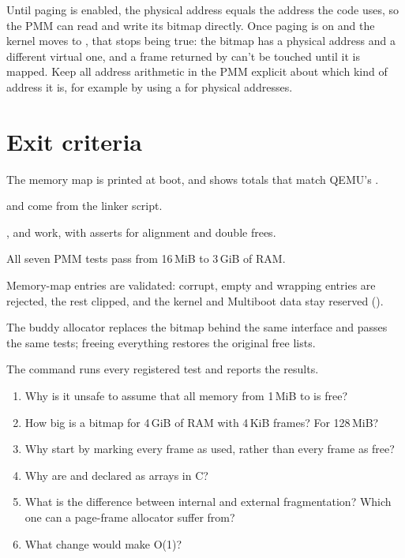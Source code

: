 \documentclass[11pt,a4paper]{article}
\begin{document}
\begin{warnbox}
Until paging is enabled, the physical address equals the address the code uses, so the PMM can read and write its bitmap directly.
Once paging is on and the kernel moves to , that stops being true: the bitmap has a physical address
and a different virtual one, and a frame returned by  can't be touched until it is mapped.
Keep all address arithmetic in the PMM explicit about which kind of address it is, for example by using a
 for physical addresses.
\end{warnbox}

\section{Exit criteria}

\begin{milestonebox}
\begin{checklist}
  \item The memory map is printed at boot, and  shows totals that match QEMU's .
  \item {} and  come from the linker script.
  \item {},  and  work, with asserts for alignment and double frees.
  \item All seven PMM tests pass from 16\,MiB to 3\,GiB of RAM.
  \item Memory-map entries are validated: corrupt, empty and wrapping entries are rejected, the rest clipped, and the kernel and Multiboot data stay reserved ().
  \item The buddy allocator replaces the bitmap behind the same interface and passes the same tests; freeing everything restores the original free lists.
  \item The  command runs every registered test and reports the results.
\end{checklist}
\end{milestonebox}

\begin{questionbox}
\begin{enumerate}
  \item Why is it unsafe to assume that all memory from 1\,MiB to  is free?
  \item How big is a bitmap for 4\,GiB of RAM with 4\,KiB frames? For 128\,MiB?
  \item Why start by marking every frame as used, rather than every frame as free?
  \item Why are  and  declared as arrays in C?
  \item What is the difference between internal and external fragmentation? Which one can a page-frame allocator suffer from?
  \item What change would make  O(1)?
\end{enumerate}
\end{questionbox}
\end{document}
